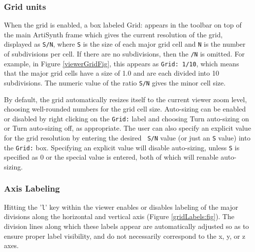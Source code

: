 \documentclass{article}
\begin{document}
\subsubsection{Grid units}
\label{GridUnits}

When the grid is enabled, a box labeled {\sf Grid:} appears in the
toolbar on top of the main ArtiSynth frame which gives the current
resolution of the grid, displayed as {\tt S/N}, where {\tt S} is the
size of each major grid cell and {\tt N} is the number of subdivisions
per cell. If there are no subdivisions, then the {\tt /N} is omitted.
For example, in Figure \ref{viewerGridFig}, this appears as {\tt Grid:
1/10}, which means that the major grid cells have a size of 1.0 and
are each divided into 10 subdivisions. The numeric value of the ratio
{\tt S/N} gives the minor cell size.

By default, the grid automatically resizes itself to the current
viewer zoom level, choosing well-rounded numbers for the grid cell
size. Auto-sizing can be enabled or disabled by right clicking on the
{\tt Grid:} label and choosing {\sf Turn auto-sizing on} or {\sf Turn
auto-sizing off}, as appropriate. The user can also specify an
explicit value for the grid resolution by entering the desired {\tt
S/N} value (or just an {\tt S} value) into the {\tt Grid:} box.
Specifying an explicit value will disable auto-sizing, unless {\tt S}
is specified as 0 or the special value {\tt *} is entered, both of
which will renable auto-sizing.

\subsubsection{Axis Labeling}
\label{AxisLabels}

Hitting the '{\tt l}' key within the viewer enables or disables
labeling of the major divisions along the horizontal and vertical axis
(Figure \ref{gridLabels:fig}). The division lines along which these
labels appear are automatically adjusted so as to ensure proper label
visibility, and do not necessarily correspond to the x, y, or z axes.
\end{document}
